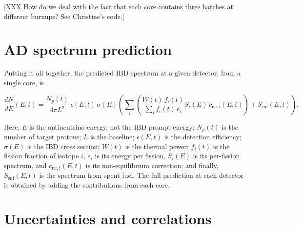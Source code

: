 \documentclass[../thesis.tex]{subfiles}
\begin{document}
[XXX How do we deal with the fact that each core contains three batches at different burnups? See Christine's code.]

\section{AD spectrum prediction}
\label{sec:adspectra}

Putting it all together, the predicted IBD spectrum at a given detector, from a single core, is

\begin{samepage}
\[ \frac{dN}{dE}(E, t) = \frac{N_p(t)}{4\pi L^2} \, \epsilon(E, t) \, \sigma(E)
  \left( \sum_i \left( \frac{W(t) \, f_i(t)}{\sum_i f_i(t) \, e_i}
    S_i(E) \, c_{\mathrm{ne},i}(E, t) \right) + S_{\mathrm{snf}}(E, t)
  \right). \]

Here, $E$ is the antineutrino energy, not the IBD prompt energy; $N_p(t)$ is the number of target protons; $L$ is the baseline; $\epsilon(E, t)$ is the detection efficiency; $\sigma(E)$ is the IBD cross section; $W(t)$ is the thermal power; $f_i(t)$ is the fission fraction of isotope $i$, $e_i$ is its energy per fission, $S_i(E)$ is its per-fission spectrum, and $c_{\mathrm{ne},i}(E, t)$ is its non-equilibrium correction; and finally, $S_\mathrm{snf}(E, t)$ is the spectrum from spent fuel. The full prediction at each detector is obtained by adding the contributions from each core.
\end{samepage}

\section{Uncertainties and correlations}
\label{sec:reacunccorr}
\end{document}
